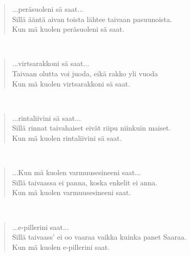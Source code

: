 \noindent\begin{minipage}{\linewidth}
\begin{verse}
	...peräsuoleni sä saat...\\
	Sillä ääntä aivan toista lähtee taivaan pasuunoista.\\
	Kun mä kuolen peräsuoleni sä saat.\\
\end{verse}
\end{minipage}\\[10pt]
\noindent\begin{minipage}{\linewidth}
\begin{verse}
	...virtsarakkoni sä saat...\\
	Taivaan olutta voi juoda, eikä rakko yli vuoda\\
	Kun mä kuolen virtsarakkoni sä saat.\\
\end{verse}
\end{minipage}\\[10pt]
\noindent\begin{minipage}{\linewidth}
\begin{verse}
	...rintaliivini sä saat...\\
	Sillä rinnat taivahaiset eivät riipu niinkuin maiset.\\
	Kun mä kuolen rintaliivini sä saat.\\
\end{verse}
\end{minipage}\\[10pt]
\noindent\begin{minipage}{\linewidth}
\begin{verse}
	...Kun mä kuolen varmuusesineeni saat...\\
	Sillä taivaassa ei panna, koska enkelit ei anna.\\
	Kun mä kuolen varmuusesineeni saat.\\
\end{verse}
\end{minipage}\\[10pt]
\noindent\begin{minipage}{\linewidth}
\begin{verse}
	...e-pillerini saat...\\
	Sillä taivaass' ei oo vaaraa vaikka kuinka panet Saaraa.\\
	Kun mä kuolen e-pillerini saat.\\
\end{verse}
\end{minipage}\\[10pt]

